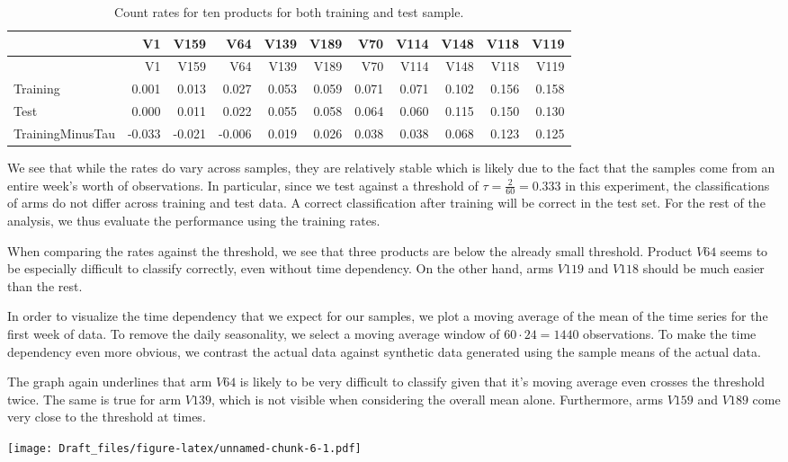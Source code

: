 \documentclass[12pt,]{article}
\begin{document}
\begin{longtable}[]{@{}lrrrrrrrrrr@{}}
\caption{Count rates for ten products for both training and test
sample.}\tabularnewline
\toprule
& V1 & V159 & V64 & V139 & V189 & V70 & V114 & V148 & V118 &
V119\tabularnewline
\midrule
\endfirsthead
\toprule
& V1 & V159 & V64 & V139 & V189 & V70 & V114 & V148 & V118 &
V119\tabularnewline
\midrule
\endhead
Training & 0.001 & 0.013 & 0.027 & 0.053 & 0.059 & 0.071 & 0.071 & 0.102
& 0.156 & 0.158\tabularnewline
Test & 0.000 & 0.011 & 0.022 & 0.055 & 0.058 & 0.064 & 0.060 & 0.115 &
0.150 & 0.130\tabularnewline
TrainingMinusTau & -0.033 & -0.021 & -0.006 & 0.019 & 0.026 & 0.038 &
0.038 & 0.068 & 0.123 & 0.125\tabularnewline
\bottomrule
\end{longtable}

We see that while the rates do vary across samples, they are relatively
stable which is likely due to the fact that the samples come from an
entire week's worth of observations. In particular, since we test
against a threshold of \(\tau = \frac{2}{60} = 0.333\) in this
experiment, the classifications of arms do not differ across training
and test data. A correct classification after training will be correct
in the test set. For the rest of the analysis, we thus evaluate the
performance using the training rates.

When comparing the rates against the threshold, we see that three
products are below the already small threshold. Product \(V64\) seems to
be especially difficult to classify correctly, even without time
dependency. On the other hand, arms \(V119\) and \(V118\) should be much
easier than the rest.

In order to visualize the time dependency that we expect for our
samples, we plot a moving average of the mean of the time series for the
first week of data. To remove the daily seasonality, we select a moving
average window of \(60\cdot24 = 1440\) observations. To make the time
dependency even more obvious, we contrast the actual data against
synthetic data generated using the sample means of the actual data.

The graph again underlines that arm \(V64\) is likely to be very
difficult to classify given that it's moving average even crosses the
threshold twice. The same is true for arm \(V139\), which is not visible
when considering the overall mean alone. Furthermore, arms \(V159\) and
\(V189\) come very close to the threshold at times.

\texttt{[image: Draft\_files/figure-latex/unnamed-chunk-6-1.pdf]}
\end{document}
